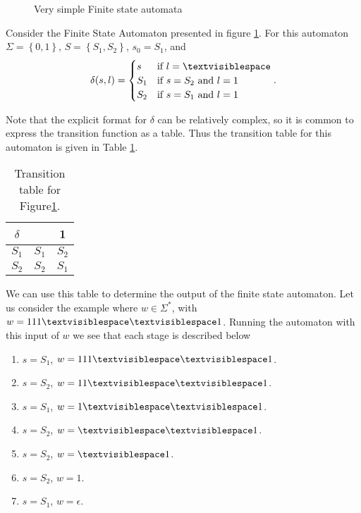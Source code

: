 \documentclass[10pt]{amsart}
\theoremstyle{definition}
\renewcommand{\sp}{\textvisiblespace}
\begin{document}
\begin{figure}[htpb]
  \begin{center}
  \end{center}
  \caption{Very simple Finite state automata}%
  \label{fig:auto_ex}
\end{figure}

Consider the Finite State Automaton presented in figure \ref{fig:auto_ex}. For
this automaton $\Sigma=\left\{0, 1\right\}$, $S=\left\{S_1,S_2\right\}$,
$s_0=S_1$, and
\begin{align*}
  \delta(s, l) = \begin{cases}
    s & \text{if }l=\sp \\
    S_1 & \text{if }s=S_2\text{ and }l=1\\
    S_2 & \text{if }s=S_1\text{ and }l=1
  \end{cases}.
\end{align*}

Note that the explicit format for $\delta$ can be relatively complex, so it is
common to express the transition function as a table. Thus the transition table
for this automaton is given in Table \ref{tab:auto_ex}.

\begin{table}[htpb]
  \centering
  \caption{Transition table for Figure\ref{fig:auto_ex}.}
  \label{tab:auto_ex}
  \begin{tabular}{c||c|c}
    $\delta$ & \sp & 1\\
    \hline\hline
    $S_1$ & $S_1$ & $S_2$\\
    \hline
    $S_2$ & $S_2$ & $S_1$\\
  \end{tabular}
\end{table}

We can use this table to determine the output of the finite state automaton.
Let us consider the example where $w\in\Sigma^*$, with $w=111\sp\sp1$. Running the
automaton with this input of $w$ we see that each stage is described below
\begin{multicols}{2}
  \begin{enumerate}
    \item $s=S_1$, $w=111\sp\sp1$.
    \item $s=S_2$, $w=11\sp\sp1$.
    \item $s=S_1$, $w=1\sp\sp1$.
    \item $s=S_2$, $w=\sp\sp1$.
    \item $s=S_2$, $w=\sp1$.
    \item $s=S_2$, $w=1$.
    \item $s=S_1$, $w=\epsilon$.
  \end{enumerate}
\end{multicols}
\end{document}
